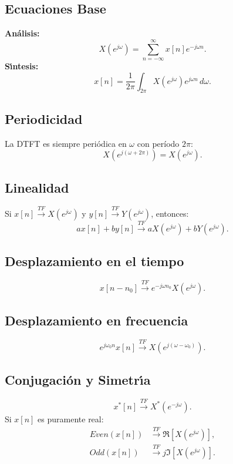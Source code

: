 \subsection{Ecuaciones Base}
\textbf{An\'{a}lisis:}
\begin{equation}
	X(e^{j\omega}) = \sum_{n=-\infty}^{\infty} x[n] e^{-j\omega n}.
\end{equation}
\textbf{S\'{\i}ntesis:}
\begin{equation}
	x[n] = \frac{1}{2\pi} \int_{2\pi} X(e^{j\omega}) e^{j\omega n} \, d\omega.
\end{equation}

\subsection{Periodicidad}
La DTFT es siempre periódica en $\omega$ con período $2\pi$:
\begin{equation}
	X(e^{j(\omega + 2\pi)}) = X(e^{j\omega}).
\end{equation}

\subsection{Linealidad}
Si $x[n] \xrightarrow{TF} X(e^{j\omega})$ y $y[n] \xrightarrow{TF} Y(e^{j\omega})$, entonces:
\begin{equation}
	a x[n] + b y[n] \xrightarrow{TF} a X(e^{j\omega}) + b Y(e^{j\omega}).
\end{equation}

\subsection{Desplazamiento en el tiempo}
\begin{equation}
	x[n - n_{0}] \xrightarrow{TF} e^{-j\omega n_{0}} X(e^{j\omega}).
\end{equation}

\subsection{Desplazamiento en frecuencia}
\begin{equation}
	e^{j\omega_{0}n} x[n] \xrightarrow{TF} X(e^{j(\omega - \omega_{0})}).
\end{equation}

\subsection{Conjugaci\'{o}n y Simetr\'{\i}a}
\begin{equation}
	x^*[n] \xrightarrow{TF} X^*(e^{-j\omega}).
\end{equation}
Si $x[n]$ es puramente real:
\begin{align}
	Even(x[n]) &\xrightarrow{TF} \Re[X(e^{j\omega})], \\
	Odd(x[n]) &\xrightarrow{TF} j\Im[X(e^{j\omega})].
\end{align}

